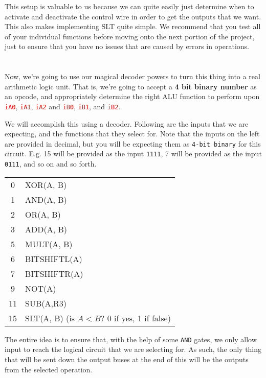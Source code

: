 \documentclass{article}
\newcommand{\varin}[1]{\textcolor{red}{\texttt{#1}}}
\begin{document}
This setup is valuable to us because we can quite easily just determine when to activate and deactivate the control wire in order to get the outputs that we want.
This also makes implementing SLT quite simple. 
We recommend that you test all of your individual functions before moving onto the next portion of the project, just to ensure that you have no issues that are caused by errors in operations.

\section{\selectfont{The Opcode Controller}}

Now, we're going to use our magical decoder powers to turn this thing into a real arithmetic logic unit.
That is, we're going to accept a \textbf{4 bit binary number} as an opcode, and appropriately determine the right ALU function to perform upon \varin{iA0}, \varin{iA1}, \varin{iA2} and \varin{iB0}, \varin{iB1}, and \varin{iB2}.

We will accomplish this using a decoder. Following are the inputs that we are expecting, and the functions that they select for. 
Note that the inputs on the left are provided in decimal, but you will be expecting them as \texttt{4-bit binary} for this circuit.
E.g. 15 will be provided as the input \texttt{1111}, 7 will be provided as the input \texttt{0111}, and so on and so forth.

\begin{tcolorbox}\begin{center}
  \begin{tabular}{c|l}
       0 & XOR(A, B)\\
       1 & AND(A, B)\\
       2 & OR(A, B)\\
       3 & ADD(A, B)\\
       5 & MULT(A, B)\\
       6 & BITSHIFTL(A)\\
       7 & BITSHIFTR(A)\\
       9 & NOT(A) \\
       11 & SUB(A,R3)\\
       15 & SLT(A, B) (is $A < B$?  0 if yes, 1 if false) \\
  \end{tabular}
  \end{center}\end{tcolorbox}

The entire idea is to ensure that, with the help of some \texttt{AND} gates, we only allow input to reach the logical circuit that we are selecting for.
As such, the only thing that will be sent down the output buses at the end of this will be the outputs from the selected operation.
\end{document}
